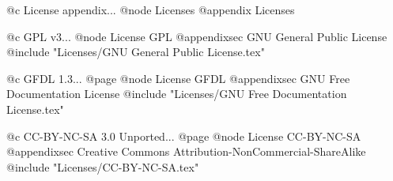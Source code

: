 @c License appendix...
@node Licenses
@appendix Licenses

@c GPL v3...
@node License GPL
@appendixsec GNU General Public License
@include "Licenses/GNU General Public License.tex"

@c GFDL 1.3...
@page
@node License GFDL
@appendixsec GNU Free Documentation License
@include "Licenses/GNU Free Documentation License.tex"

@c CC-BY-NC-SA 3.0 Unported...
@page
@node License CC-BY-NC-SA
@appendixsec Creative Commons Attribution-NonCommercial-ShareAlike
@include "Licenses/CC-BY-NC-SA.tex"


